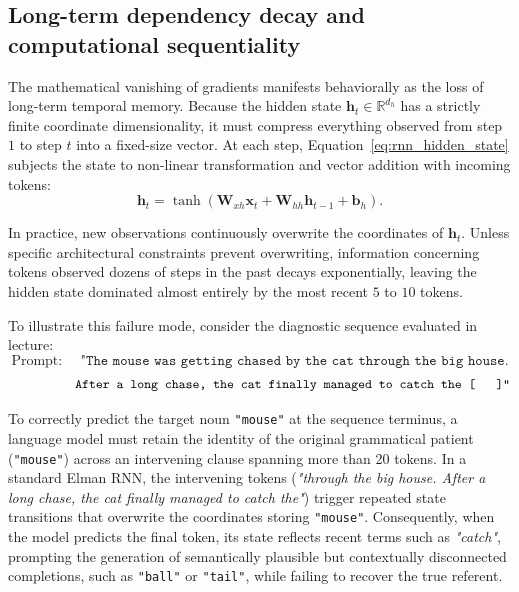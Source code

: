 \documentclass[../../main.tex]{subfiles}
\begin{document}
\subsection{Long-term dependency decay and computational sequentiality}
\label{subsec:rnn_long_term_decay_sequentiality}

The mathematical vanishing of gradients manifests behaviorally as the loss of long-term temporal memory. Because the hidden state $\mathbf{h}_t \in \mathbb{R}^{d_h}$ has a strictly finite coordinate dimensionality, it must compress everything observed from step $1$ to step $t$ into a fixed-size vector. At each step, Equation~\ref{eq:rnn_hidden_state} subjects the state to non-linear transformation and vector addition with incoming tokens:
\begin{equation}
\mathbf{h}_t = \tanh\left(\mathbf{W}_{xh} \mathbf{x}_t + \mathbf{W}_{hh} \mathbf{h}_{t-1} + \mathbf{b}_h\right).
\end{equation}

In practice, new observations continuously overwrite the coordinates of $\mathbf{h}_t$. Unless specific architectural constraints prevent overwriting, information concerning tokens observed dozens of steps in the past decays exponentially, leaving the hidden state dominated almost entirely by the most recent $5$ to $10$ tokens.

To illustrate this failure mode, consider the diagnostic sequence evaluated in lecture:
\begin{equation}
\text{Prompt: } \quad \texttt{"The mouse was getting chased by the cat through the big house.}
\end{equation}
\begin{equation}
\quad \quad \quad \quad \quad \texttt{After a long chase, the cat finally managed to catch the [ \quad ]"}
\end{equation}

To correctly predict the target noun \texttt{"mouse"} at the sequence terminus, a language model must retain the identity of the original grammatical patient (\texttt{"mouse"}) across an intervening clause spanning more than 20 tokens. In a standard Elman RNN, the intervening tokens (\textit{"through the big house. After a long chase, the cat finally managed to catch the"}) trigger repeated state transitions that overwrite the coordinates storing \texttt{"mouse"}. Consequently, when the model predicts the final token, its state reflects recent terms such as \textit{"catch"}, prompting the generation of semantically plausible but contextually disconnected completions, such as \texttt{"ball"} or \texttt{"tail"}, while failing to recover the true referent.
\end{document}
